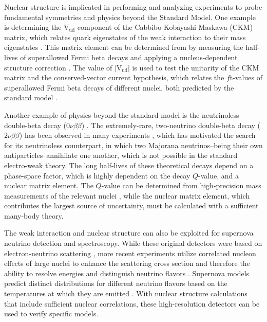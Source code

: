 \documentclass[../thesis.tex]{subfiles}
\begin{document}
Nuclear structure is implicated in performing and analyzing experiments to probe fundamental symmetries and physics beyond the Standard Model. One example is determining the $\mathrm{V_{ud}}$ component of the Cabbibo-Kobayashi-Maskawa (CKM) matrix, which relates quark eigenstates of the weak interaction to their mass eigenstates \cite{CABBIBO1963531,KOBAYASHI1973652}. This matrix element can be determined from by measuring the half-lives of superallowed Fermi beta decays \cite{TOWNER2003197} and applying a nucleus-dependent structure correction \cite{TOWNER2008025501,TOWNER199413,TOWNER1992478,BARKER1992501,JAUS1990166}. The value of $\left|\mathrm{V_{ud}}\right|$ is used to test the unitarity of the CKM matrix and the conserved-vector current hypothesis, which relates the $f$t-values of superallowed Fermi beta decays of different nuclei, both predicted by the standard model \cite{HARDY2005055501}.

Another example of physics beyond the standard model is the neutrinoless double-beta decay ($0\nu\beta\beta$) \cite{SUHONEN1998123,AVIGNONE2008481}. The extremely-rare, two-neutrino double-beta decay ($2\nu\beta\beta$) has been observed in many experiments \cite{ELLIOTT19872020,MILEY19903092}, which has motivated the search for its neutrinoless counterpart, in which two Majorana neutrinos--being their own antiparticles--annihilate one another, which is not possible in the standard electro-weak theory. The long half-lives of these theoretical decays depend on a phase-space factor, which is highly dependent on the decay $Q$-value, and a nuclear matrix element. The $Q$-value can be determined from high-precision mass measurements of the relevant nuclei \cite{LINCOLN2013012501,GULYUZ2015055501,REDSHAW2012041306,BUSTABAD2013022501}, while the nuclear matrix element, which contributes the largest source of uncertainty, must be calculated with a sufficient many-body theory. 

The weak interaction and nuclear structure can also be exploited for supernova neutrino detection and spectroscopy. While these original detectors were based on electron-neutrino scattering \cite{HIRATA19871490,BIONTA19871494}, more recent experiments utilize correlated nucleon effects of large nuclei to enhance the scattering cross section and therefore the ability to resolve energies and distinguish neutrino flavors \cite{HARGROVE1996183,CLINE1994720,EWAN1992373,LANGANKE19962629}. Supernova models predict distinct distributions for different neutrino flavors based on the temperatures at which they are emitted \cite{KOLBE20032569,BENHAR2005053005}. With nuclear structure calculations that include sufficient nuclear correlations, these high-resolution detectors can be used to verify specific models.
\end{document}
